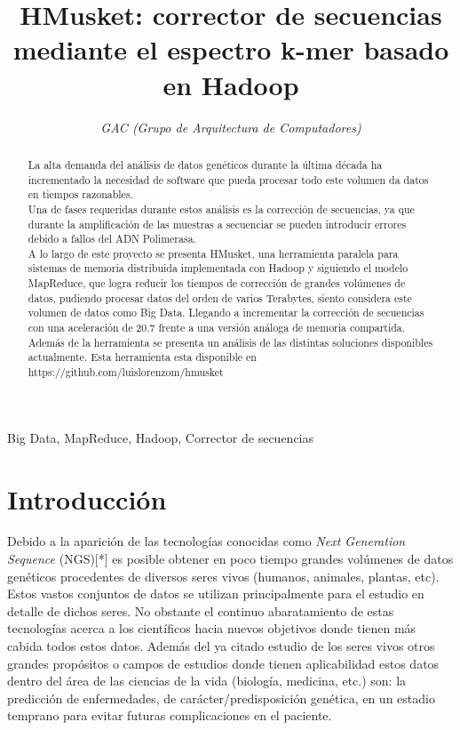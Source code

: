 \documentclass[conference]{IEEEtran}
\begin{document}
\title{HMusket: corrector de secuencias mediante el espectro k-mer basado en Hadoop}

\author{
	\textit{GAC (Grupo de Arquitectura de Computadores)}\\
}

\maketitle

\begin{abstract}
La alta demanda del análisis de datos genéticos durante la última década ha incrementado la necesidad de software que pueda procesar todo este volumen da datos en tiempos razonables.\\
Una de fases requeridas durante estos análisis es la corrección de secuencias, ya que durante la amplificación de las muestras a secuenciar se pueden introducir errores debido a fallos del ADN Polimerasa.\\
A lo largo de este proyecto se presenta HMusket, una herramienta paralela para sistemas de memoria distribuida implementada con Hadoop y siguiendo el modelo MapReduce, que logra reducir los tiempos de corrección de grandes volúmenes de datos, pudiendo procesar datos del orden de varios Terabytes, siento considera este volumen de datos como Big Data. Llegando a incrementar la corrección de secuencias con una aceleración de 20.7 frente a una versión análoga de memoria compartida. Además de la herramienta se presenta un análisis de las distintas soluciones disponibles actualmente. Esta herramienta esta disponible en https://github.com/luislorenzom/hmusket
\end{abstract}

\begin{IEEEkeywords}
Big Data, MapReduce, Hadoop, Corrector de secuencias
\end{IEEEkeywords}

\section{Introducción}
Debido a la aparición de las tecnologías conocidas como \textit{Next Generation Sequence} (NGS)[*] es posible obtener en poco tiempo grandes volúmenes de datos genéticos procedentes de diversos seres vivos (humanos, animales, plantas, etc). Estos vastos conjuntos de datos se utilizan principalmente para el estudio en detalle de dichos seres. 
No obstante el continuo abaratamiento de estas tecnologías acerca a los científicos hacia nuevos objetivos donde tienen más cabida todos estos datos. Además del ya citado estudio de los seres vivos otros grandes propósitos o campos de estudios donde tienen aplicabilidad estos datos dentro del área de las ciencias de la vida (biología, medicina, etc.) son: la predicción de enfermedades, de carácter/predisposición genética, en un estadio temprano para evitar futuras complicaciones en el paciente. \\
\end{document}
